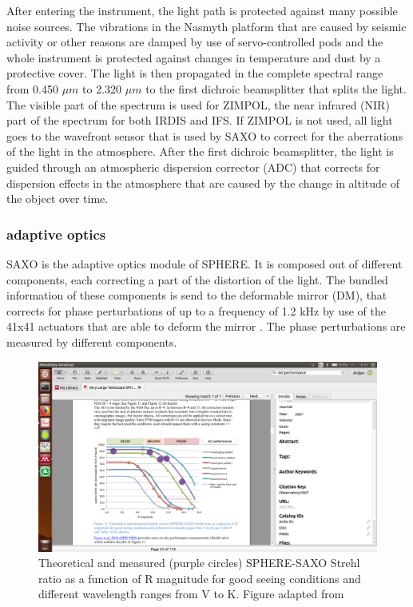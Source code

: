 \documentclass[twoside,single]{lion-msc}
\begin{document}
After entering the instrument, the light path is protected against many possible noise sources. The vibrations in the Nasmyth platform that are caused by seismic activity or other reasons are damped by use of servo-controlled pods and the whole instrument is protected against changes in temperature and dust by a protective cover. The light is then propagated in the complete spectral range from 0.450 $\mu m$ to 2.320 $\mu m$ to the first dichroic beamsplitter that splits the light. The visible part of the spectrum is used for ZIMPOL, the near infrared (NIR) part of the spectrum for both IRDIS and IFS. If ZIMPOL is not used, all light goes to the wavefront sensor that is used by SAXO to correct for the aberrations of the light in the atmosphere. After the first dichroic beamsplitter, the light is guided through an atmospheric dispersion corrector (ADC) that corrects for dispersion effects in the atmosphere that are caused by the change in altitude of the object over time.
\bigskip

\subsubsection{adaptive optics}
SAXO is the adaptive optics module of SPHERE. It is composed out of different components, each correcting a part of the distortion of the light. The bundled information of these components is send to the deformable mirror (DM), that corrects for phase perturbations of up to a frequency of 1.2 kHz by use of the 41x41 actuators that are able to deform the mirror \citep{Hugot2012}. The phase perturbations are measured by different components.
\bigskip

\begin{figure}[htbp]
\centering
\includegraphics[trim={7cm 4.5cm 19cm 10cm},clip,width = 1\textwidth]{aoperformance}
\caption{Theoretical and measured (purple circles) SPHERE-SAXO Strehl ratio as a function of R magnitude for good seeing conditions and different wavelength ranges from V to K. Figure adapted from \citep{Fusco2014}}
\label{fig:aoperformance}
\end{figure}
\end{document}
